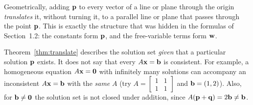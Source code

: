 \documentclass[11pt]{article}
\begin{document}
Geometrically, adding $\mathbf{p}$ to every vector of a line or plane through the origin \emph{translates} it, without turning it, to a parallel line or plane that passes through the point $\mathbf{p}$.
This is exactly the structure that was hidden in the formulas of Section~1.2: the constants form $\mathbf{p}$, and the free-variable terms form $\mathbf{w}$.

\begin{warn}
Theorem~\ref{thm:translate} describes the solution set \emph{given} that a particular solution $\mathbf{p}$ exists. It does not say that every $A\mathbf{x}=\mathbf{b}$ is consistent. For example, a homogeneous equation $A\mathbf{x}=\mathbf{0}$
with infinitely many solutions can accompany an inconsistent $A\mathbf{x}=\mathbf{b}$ with the \emph{same} $A$ (try $A=\begin{bmatrix}1&1\\1&1\end{bmatrix}$ and $\mathbf{b}=(1,2)$). Also, for $\mathbf{b}\neq\mathbf{0}$ the solution set is not closed under addition, since $A(\mathbf{p}+\mathbf{q})=2\mathbf{b}\neq\mathbf{b}$.
\end{warn}
\end{document}
